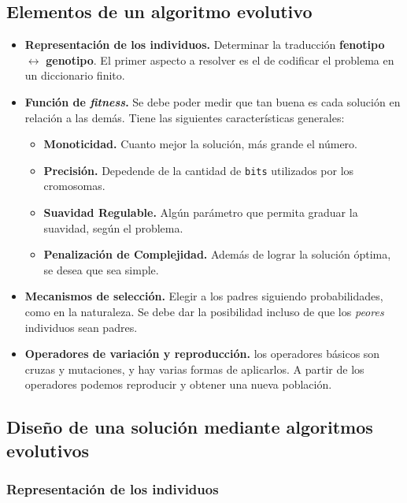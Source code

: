 \documentclass[10pt,a4paper]{article}
\begin{document}
\subsection{Elementos de un algoritmo evolutivo}

\begin{itemize}
\item \textbf{Representación de los individuos.} Determinar la traducción \textbf{fenotipo} $\leftrightarrow$ \textbf{genotipo}. El primer aspecto a resolver es el de codificar el problema en un diccionario finito.
\item \textbf{Función de \textit{fitness}.} Se debe poder medir que tan buena es cada solución en relación a las demás. Tiene las siguientes características generales:
\begin{itemize}
\item \textbf{Monoticidad.} Cuanto mejor la solución, más grande el número.
\item \textbf{Precisión.} Depedende de la cantidad de \texttt{bits} utilizados por los cromosomas.
\item \textbf{Suavidad Regulable.} Algún parámetro que permita graduar la suavidad, según el problema.
\item \textbf{Penalización de Complejidad.} Además de lograr la solución óptima, se desea que sea simple.
\end{itemize}
\item \textbf{Mecanismos de selección.} Elegir a los padres siguiendo probabilidades, como en la naturaleza. Se debe dar la posibilidad incluso de que los \textit{peores} individuos sean padres.
\item \textbf{Operadores de variación y reproducción.} los operadores básicos son cruzas y mutaciones, y hay varias formas de aplicarlos. A partir de los operadores podemos reproducir y obtener una nueva población.
\end{itemize}

\subsection{Diseño de una solución mediante algoritmos evolutivos}

\subsubsection{Representación de los individuos}
\end{document}

